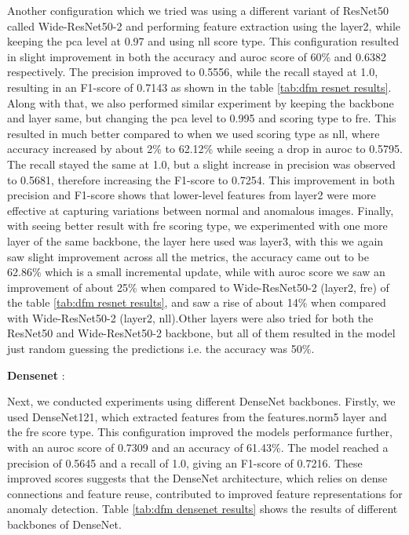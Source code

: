 Another configuration which we tried was using a different variant of ResNet50 called Wide-ResNet50-2 and performing feature extraction using the layer2, while keeping the \gls{pca} level at 0.97 and using \gls{nll} score type. This configuration resulted in slight improvement in both the accuracy and \gls{auroc} score of 60\% and 0.6382 respectively. The precision improved to 0.5556, while the recall stayed at 1.0, resulting in an F1-score of 0.7143 as shown in the table \ref{tab:dfm resnet results}. Along with that, we also performed similar experiment by keeping the backbone and layer same, but changing the \gls{pca} level to 0.995 and scoring type to \gls{fre}. This resulted in much better compared to when we used scoring type as \gls{nll}, where accuracy increased by about 2\% to 62.12\% while seeing a drop in \gls{auroc} to 0.5795. The recall stayed the same at 1.0, but a slight increase in precision was observed to 0.5681, therefore increasing the F1-score to 0.7254. This improvement in both precision and F1-score shows that lower-level features from layer2 were more effective at capturing variations between normal and anomalous images. Finally, with seeing better result with \gls{fre} scoring type, we experimented with one more layer of the same backbone, the layer here used was layer3, with this we again saw slight improvement across all the metrics, the accuracy came out to be 62.86\% which is a small incremental update, while with \gls{auroc} score we saw an improvement of about 25\% when compared to Wide-ResNet50-2 (layer2, \gls{fre}) of the table \ref{tab:dfm resnet results}, and saw a rise of about 14\% when compared with Wide-ResNet50-2 (layer2, \gls{nll}).Other layers were also tried for both the ResNet50 and Wide-ResNet50-2 backbone, but all of them resulted in the model just random guessing the predictions i.e. the accuracy was 50\%.

\textbf{Densenet} : 

Next, we conducted experiments using different DenseNet backbones. Firstly, we used DenseNet121, which extracted features from the features.norm5 layer and the \gls{fre} score type. This configuration improved the models performance further, with an \gls{auroc} score of 0.7309 and an accuracy of 61.43\%. The model reached a precision of 0.5645 and a recall of 1.0, giving an F1-score of 0.7216. These improved scores suggests that the DenseNet architecture, which relies on dense connections and feature reuse, contributed to improved feature representations for anomaly detection. Table \ref{tab:dfm densenet results} shows the results of different backbones of DenseNet.

